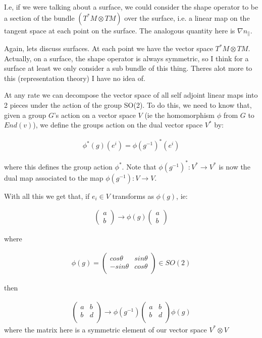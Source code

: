\documentclass[11pt,onecolumn, a4page]{article}
\numberwithin{equation}{subsection}
\begin{document}
I.e, if we were talking about a surface, we could consider the shape operator to be a section of the bundle $(T^{*}M \otimes TM)$ over the surface, i.e. a linear map on the tangent space at each point on the surface. The analogous quantity here is $\nabla n_{\parallel}$.

Again, lets discuss surfaces. At each point we have the vector space $T^{*}M \otimes TM$.  Actually, on a surface, the shape operator is always symmetric, so I think for a surface at least we only consider a sub bundle of this thing.  Theres alot more to this (representation theory) I have no idea of. 

At any rate we can decompose the vector space of all self adjoint linear maps into 2 pieces under the action of the group SO(2). To do this, we need to know that, given a group $G$'s action on a vector space $V$ (ie the homomorphism $\phi$ from $G$ to $End(v)$), we define the groups action on the dual vector space $V^{*}$ by: 


\begin{eqnarray}
 \phi^{*}(g)(e^{i}) = \phi(g^{-1})^{*}(e^{i})
\end{eqnarray}

where this defines the group action $\phi^{*}$. Note that $\phi(g^{-1})^{*}: V^{*} \rightarrow V^{*}$ is now the dual map  associated to the map $\phi(g^{-1}) :V \rightarrow V$.

With all this we get that, if $e_{i} \in V$ transforms as $\phi(g)$, ie:

\begin{eqnarray}
 \begin{pmatrix}a\\b\end{pmatrix} \rightarrow \phi(g)\begin{pmatrix}a\\b\end{pmatrix}
\end{eqnarray}

where 

\begin{eqnarray}
 \phi(g)= \begin{pmatrix} 
 cos \theta & sin \theta \\
  -sin \theta & cos \theta \\
 \end{pmatrix} \in SO(2)
\end{eqnarray}

then 

\begin{eqnarray}
\begin{pmatrix} 
 a & b\\
  b & d \\
 \end{pmatrix} 
 \rightarrow  
 \phi(g^{-1})
 \begin{pmatrix} 
 a & b\\
  b & d \\
 \end{pmatrix}
  \phi(g)
\end{eqnarray}
where the matrix here is a symmetric element of our vector space $V^{*} \otimes V$
\end{document}
